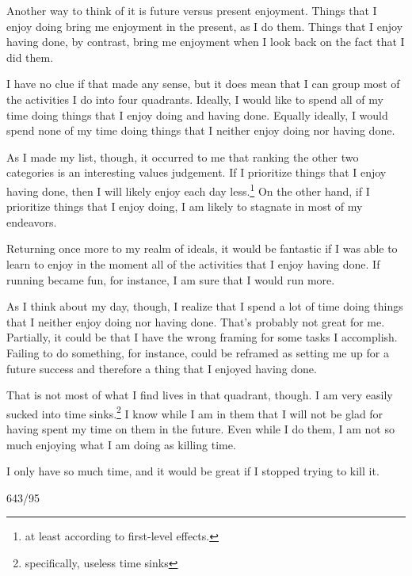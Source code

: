 \documentclass[12pt]{article}[titlepage]
\newcommand{\1}{\={a}}
\newcommand{\2}{\={e}}
\newcommand{\3}{\={\i}}
\newcommand{\4}{\=o}
\newcommand{\5}{\=u}
\newcommand{\6}{\={A}}
\renewcommand{\,}{\textsuperscript{,}}
\begin{document}
Another way to think of it is future versus present enjoyment.
Things that I enjoy doing bring me enjoyment in the present, as I do them.
Things that I enjoy having done, by contrast, bring me enjoyment when I look back on the fact that I did them.

I have no clue if that made any sense, but it does mean that I can group most of the activities I do into four quadrants.
Ideally, I would like to spend all of my time doing things that I enjoy doing and having done.
Equally ideally, I would spend none of my time doing things that I neither enjoy doing nor having done.

As I made my list, though, it occurred to me that ranking the other two categories is an interesting values judgement.
If I prioritize things that I enjoy having done, then I will likely enjoy each day less.\footnote{at least according to first-level effects.}
On the other hand, if I prioritize things that I enjoy doing, I am likely to stagnate in most of my endeavors.

Returning once more to my realm of ideals, it would be fantastic if I was able to learn to enjoy in the moment all of the activities that I enjoy having done.
If running became fun, for instance, I am sure that I would run more.

As I think about my day, though, I realize that I spend a lot of time doing things that I neither enjoy doing nor having done.
That's probably not great for me.
Partially, it could be that I have the wrong framing for some tasks I accomplish.
Failing to do something, for instance, could be reframed as setting me up for a future success and therefore a thing that I enjoyed having done.

That is not most of what I find lives in that quadrant, though.
I am very easily sucked into time sinks.\footnote{specifically, useless time sinks}
I know while I am in them that I will not be glad for having spent my time on them in the future.
Even while I do them, I am not so much enjoying what I am doing as killing time.

I only have so much time, and it would be great if I stopped trying to kill it.

643/95
\end{document}
